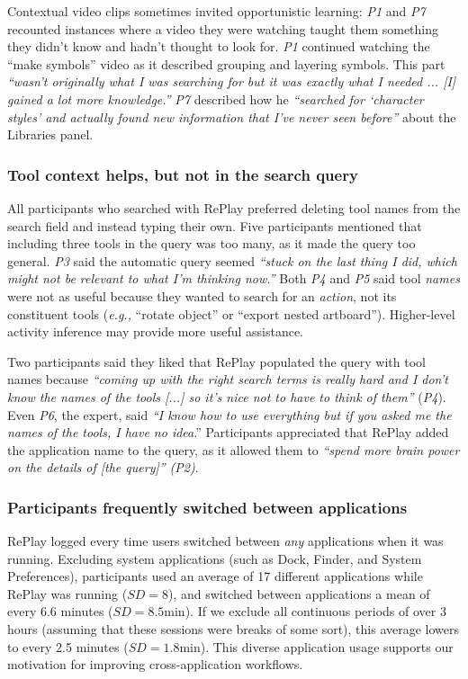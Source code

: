 Contextual video clips sometimes invited opportunistic learning: \textit{P1} and \textit{P7} recounted instances where a video they were watching taught them something they didn't know and hadn't thought to look for. \textit{P1} continued watching the ``make symbols'' video as it described grouping and layering symbols. This part \textit{``wasn't originally what I was searching for but it was exactly what I needed ... [I] gained a lot more knowledge.''} \textit{P7} described how he \textit{``searched for `character styles' and actually found new information that I've never seen before''} about the Libraries panel.

\subsubsection{Tool context helps, but not in the search query}
All participants who searched with RePlay preferred deleting tool names from the search field and instead typing their own. Five participants mentioned that including three tools in the query was too many, as it made the query too general. \textit{P3} said the automatic query seemed \textit{``stuck on the last thing I did, which might not be relevant to what I'm thinking now.''} Both \textit{P4} and \textit{P5} said tool \textit{names} were not as useful because they wanted to search for an \textit{action}, not its constituent tools (\textit{e.g.,} ``rotate object'' or ``export nested artboard''). Higher-level activity inference may provide more useful assistance.

Two participants said they liked that RePlay populated the query with tool names because \textit{``coming up with the right search terms is really hard and I don't know the names of the tools [...] so it's nice not to have to think of them''} (\textit{P4}). Even \textit{P6}, the expert, said \textit{``I know how to use everything but if you asked me the names of the tools, I have no idea}.'' Participants appreciated that RePlay added the application name to the query, as it allowed them to \textit{``spend more brain power on the details of [the query]'' (P2)}. 

\subsubsection{Participants frequently switched between applications}
RePlay logged every time users switched between \textit{any} applications when it was running. Excluding system applications (such as Dock, Finder, and System Preferences), participants used an average of 17 different applications while RePlay was running ($SD\!=\!8$), and switched between applications a mean of every 6.6 minutes ($SD\!=\!8.5$min). If we exclude all continuous periods of over 3 hours (assuming that these sessions were breaks of some sort), this average lowers to every 2.5 minutes ($SD\!=\!1.8$min). This diverse application usage supports our motivation for improving cross-application workflows.

